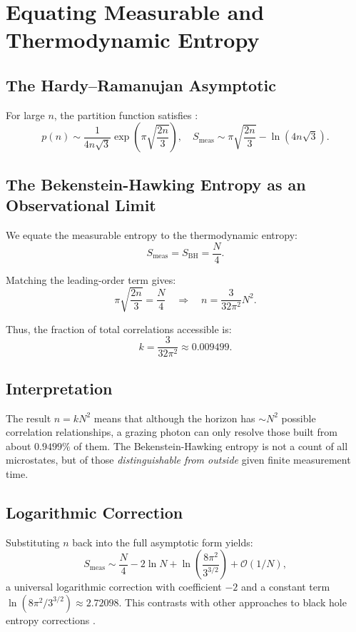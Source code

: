 \documentclass[12pt, letterpaper]{article}
\begin{document}
\section{Equating Measurable and Thermodynamic Entropy}

\subsection{The Hardy–Ramanujan Asymptotic}

For large $n$, the partition function satisfies \cite{hardy1918}:
\begin{equation}
p(n) \sim \frac{1}{4n\sqrt{3}} \exp\left( \pi \sqrt{\frac{2n}{3}} \right),
\quad
S_{\mathrm{meas}} \sim \pi \sqrt{\frac{2n}{3}} - \ln(4n\sqrt{3}).
\label{eq:HR}
\end{equation}

\subsection{The Bekenstein-Hawking Entropy as an Observational Limit}

We equate the measurable entropy to the thermodynamic entropy:
\[
S_{\mathrm{meas}} = S_{\mathrm{BH}} = \frac{N}{4}.
\]

Matching the leading-order term gives:
\[
\pi \sqrt{\frac{2n}{3}} = \frac{N}{4}
\quad\Rightarrow\quad
n = \frac{3}{32\pi^2} N^2.
\]

Thus, the fraction of total correlations accessible is:
\begin{equation}
k = \frac{3}{32\pi^2} \approx 0.009499.
\label{eq:k}
\end{equation}

\subsection{Interpretation}

The result $n = k N^2$ means that although the horizon has $\sim N^2$ possible correlation relationships, a grazing photon can only resolve those built from about $0.9499\%$ of them. The Bekenstein-Hawking entropy is not a count of all microstates, but of those \emph{distinguishable from outside} given finite measurement time.

\subsection{Logarithmic Correction}

Substituting $n$ back into the full asymptotic form yields:
\[
S_{\mathrm{meas}} \sim \frac{N}{4} - 2\ln N + \ln\left(\frac{8\pi^{2}}{3^{3/2}}\right) + \mathcal{O}(1/N),
\]
a universal logarithmic correction with coefficient $-2$ and a constant term $\ln(8\pi^{2}/3^{3/2}) \approx 2.72098$. This contrasts with other approaches to black hole entropy corrections \cite{kaul2000, cardy1986, solodukhin1998}.
\end{document}
